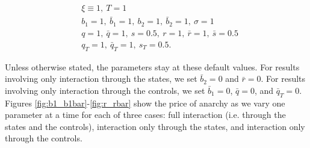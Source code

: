 \documentclass[11pt]{article}
\begin{document}
\begin{equation*}
\begin{split}
    &\xi\equiv 1,\ T=1 \\
    &b_1=1,\  \bar{b}_1=1,\ b_2=1,\ \bar{b}_2=1,\ \sigma=1 \\
    &q=1,\ \bar{q}=1,\ s=0.5,\ r=1,\ \bar{r}=1,\ \bar{s}=0.5 \\
    &q_T=1,\  \bar{q}_T=1,\ s_T=0.5.
\end{split}
\end{equation*}

Unless otherwise stated, the parameters stay at these default values. For results involving only interaction through the states, we set $\bar{b}_2=0$ and $\bar{r}=0$. For results involving only interaction through the controls, we set $\bar{b}_1=0$, $\bar{q}=0$, and $\bar{q}_T=0$. Figures \ref{fig:b1_b1bar}-\ref{fig:r_rbar} show the price of anarchy as we vary one parameter at a time for each of three cases: full interaction (i.e. through the states and the controls), interaction only through the states, and interaction only through the controls.
\end{document}
